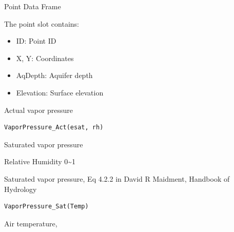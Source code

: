 \documentclass[a4paper]{book}
\begin{document}
%
\begin{Section}{Point Data Frame}

The point slot contains:
\begin{itemize}

\item{} ID: Point ID
\item{} X, Y: Coordinates
\item{} AqDepth: Aquifer depth
\item{} Elevation: Surface elevation

\end{itemize}

\end{Section}
%
\begin{Description}\relax
Actual vapor pressure
\end{Description}
%
\begin{Usage}
\begin{verbatim}
VaporPressure_Act(esat, rh)
\end{verbatim}
\end{Usage}
%
\begin{Arguments}
\begin{ldescription}
\item[\code{esat}] Saturated vapor pressure

\item[\code{rh}] Relative Humidity  0\textasciitilde{}1
\end{ldescription}
\end{Arguments}
%
\begin{Description}\relax
Saturated vapor pressure, Eq 4.2.2 in David R Maidment, Handbook of Hydrology
\end{Description}
%
\begin{Usage}
\begin{verbatim}
VaporPressure_Sat(Temp)
\end{verbatim}
\end{Usage}
%
\begin{Arguments}
\begin{ldescription}
\item[\code{Temp}] Air temperature, 
\end{ldescription}
\end{Arguments}
\end{document}
